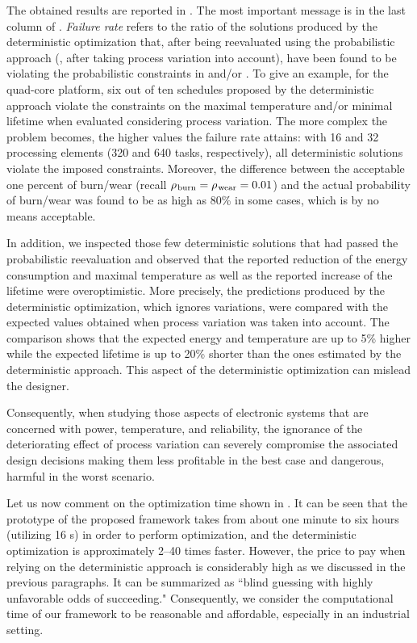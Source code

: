 The obtained results are reported in .
The most important message is in the last column of .
\emph{Failure rate} refers to the ratio of the solutions produced by the deterministic optimization that, after being reevaluated using the probabilistic approach (\ie, after taking process variation into account), have been found to be violating the probabilistic constraints in  and/or .
To give an example, for the quad-core platform, six out of ten schedules proposed by the deterministic approach violate the constraints on the maximal temperature and/or minimal lifetime when evaluated considering process variation.
The more complex the problem becomes, the higher values the failure rate attains: with 16 and 32 processing elements (320 and 640 tasks, respectively), all deterministic solutions violate the imposed constraints.
Moreover, the difference between the acceptable one percent of burn/wear (recall $\rho_{\text{\kern0.1emburn}} = \rho_{\text{\kern0.1emwear}} = 0.01$) and the actual probability of burn/wear was found to be as high as 80\% in some cases, which is by no means acceptable.

In addition, we inspected those few deterministic solutions that had passed the probabilistic reevaluation and observed that the reported reduction of the energy consumption and maximal temperature as well as the reported increase of the lifetime were overoptimistic.
More precisely, the predictions produced by the deterministic optimization, which ignores variations, were compared with the expected values obtained when process variation was taken into account.
The comparison shows that the expected energy and temperature are up to 5\% higher while the expected lifetime is up to 20\% shorter than the ones estimated by the deterministic approach.
This aspect of the deterministic optimization can mislead the designer.

Consequently, when studying those aspects of electronic systems that are concerned with power, temperature, and reliability, the ignorance of the deteriorating effect of process variation can severely compromise the associated design decisions making them less profitable in the best case and dangerous, harmful in the worst scenario.

Let us now comment on the optimization time shown in .
It can be seen that the prototype of the proposed framework takes from about one minute to six hours (utilizing 16 s) in order to perform optimization, and the deterministic optimization is approximately 2--40 times faster.
However, the price to pay when relying on the deterministic approach is considerably high as we discussed in the previous paragraphs.
It can be summarized as ``blind guessing with highly unfavorable odds of succeeding."
Consequently, we consider the computational time of our framework to be reasonable and affordable, especially in an industrial setting.

